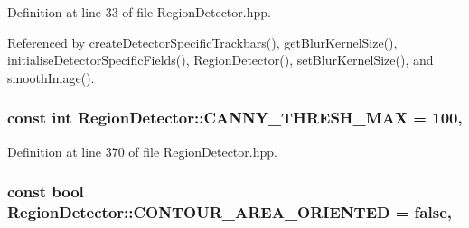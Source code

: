 Definition at line 33 of file Region\-Detector.\-hpp.



Referenced by create\-Detector\-Specific\-Trackbars(), get\-Blur\-Kernel\-Size(), initialise\-Detector\-Specific\-Fields(), Region\-Detector(), set\-Blur\-Kernel\-Size(), and smooth\-Image().

\hypertarget{classmultiscale_1_1analysis_1_1RegionDetector_ad6590f4617a6b3d34c6032f8febd7beb}{
\subsubsection[{C\-A\-N\-N\-Y\-\_\-\-T\-H\-R\-E\-S\-H\-\_\-\-M\-A\-X}]{\setlength{\rightskip}{0pt plus 5cm}const int Region\-Detector\-::\-C\-A\-N\-N\-Y\-\_\-\-T\-H\-R\-E\-S\-H\-\_\-\-M\-A\-X = 100\hspace{0.3cm}{\ttfamily [static]}, {\ttfamily [private]}}}\label{classmultiscale_1_1analysis_1_1RegionDetector_ad6590f4617a6b3d34c6032f8febd7beb}


Definition at line 370 of file Region\-Detector.\-hpp.

\hypertarget{classmultiscale_1_1analysis_1_1RegionDetector_ab1fdebf0daaae6f2bb1fe4770479116f}{
\subsubsection[{C\-O\-N\-T\-O\-U\-R\-\_\-\-A\-R\-E\-A\-\_\-\-O\-R\-I\-E\-N\-T\-E\-D}]{\setlength{\rightskip}{0pt plus 5cm}const bool Region\-Detector\-::\-C\-O\-N\-T\-O\-U\-R\-\_\-\-A\-R\-E\-A\-\_\-\-O\-R\-I\-E\-N\-T\-E\-D = false\hspace{0.3cm}{\ttfamily [static]}, {\ttfamily [private]}}}\label{classmultiscale_1_1analysis_1_1RegionDetector_ab1fdebf0daaae6f2bb1fe4770479116f}


